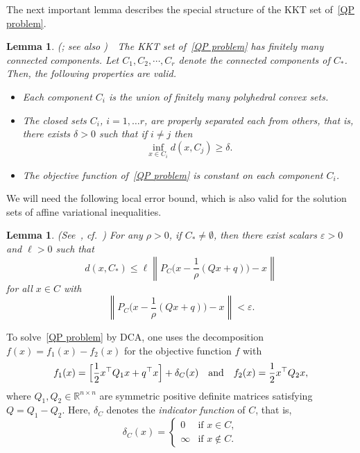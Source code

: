 \documentclass[11pt]{article}
\newtheorem{lemma}[theorem]{Lemma}
\theoremstyle{definition}
\theoremstyle{remark}
\begin{document}
 
The next important lemma describes the special structure of the KKT set of~\eqref{QP problem}.

		\begin{lemma}\label{lem:KKT_components} {\rm (\cite[Lemma~3.1 and its proof]{LT_1992}; see also \cite[Lemma 2.2]{Tuan_JMAA2015})}\ \, The KKT set of~\eqref{QP problem} has finitely many connected components.	Let $C_1, C_2, \cdots, C_r$ denote the connected components of $C_*$. Then, the following properties are valid.
			\begin{itemize}
				\item[{\rm (a)}] Each component $C_i$ is the union of finitely many polyhedral convex sets.
				\item[{\rm (b)}] The closed sets $C_i$, $i=1,\ldots r$, are properly separated each from others, that is, there exists $\delta>0$ such that if  $i\neq j$ then
				\begin{equation}\label{positive_excess}
					\inf\limits_{x\in C_i }d(x,C_j)\geq \delta.
				\end{equation}
				\item[{\rm (c)}] The objective function of~\eqref{QP problem} is constant on each component $C_i$.
			\end{itemize}
	\end{lemma}

We will need the following local error bound, which is also valid for the solution sets of affine variational inequalities.

 \begin{lemma}\label{lem:dist_kkt_set}{\rm (See~\cite[Lemma 2.1]{Tuan_JMAA2015}, cf.~\cite[Lemma~3.1]{LT_1992})} \textit{For any $\rho>0$, if $C_*\neq \emptyset$, then there exist scalars $\varepsilon>0$ and $\ell>0$ such that
 	\begin{equation}\label{ERB}
 		d(x,C_*)\leq \ell \left\|P_C\Big(x-\frac{1}{\rho}(Qx+q)\Big)-x\right\|
 	\end{equation}
 	for all $x\in C$ with
 	\begin{equation}\label{locality}
 		\left\|P_C\Big(x-\frac{1}{\rho}(Qx+q)\Big)-x\right\|<\varepsilon.
 	\end{equation}}
 \end{lemma}
 
To solve~\eqref{QP problem} by DCA, one uses the decomposition  $f(x)=f_1(x)-f_2(x)$ for the objective function $f$ with
\begin{eqnarray*}
	f_1(x)
	=
	\Big[\frac{1}{2}x^\top Q_1x+q^\top x\Big]
	+\delta_C(x)
	\quad {\rm and} \quad
	f_2(x)
	=
	\frac{1}{2}x^\top Q_2x,
\end{eqnarray*}
where $Q_1,Q_2\in \mathbb R^{n\times n}$ are symmetric positive definite matrices satisfying $Q=Q_1-Q_2$. Here, $\delta_C$ denotes the \textit{indicator function} of $C$, that is,
\[
\delta_C(x)=
\begin{cases}
	0 & \text{if } x\in C,\\
	\infty & \text{if } x\notin C.
\end{cases}
\]
\end{document}

